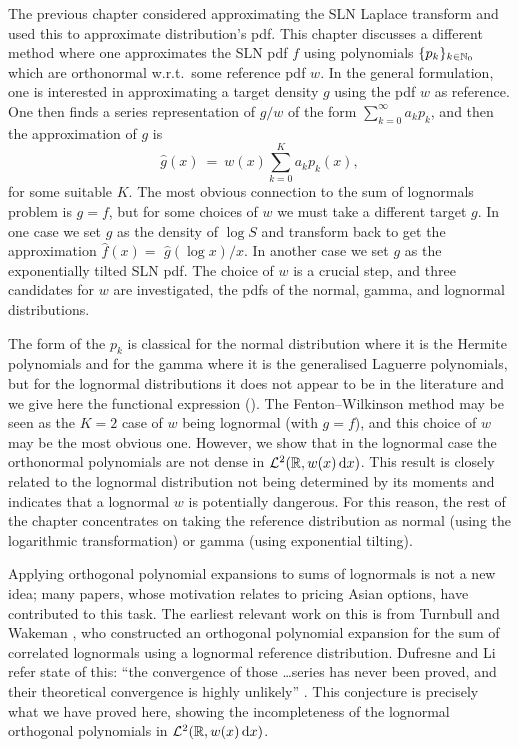 The previous chapter considered approximating the SLN Laplace transform and used this to approximate distribution's pdf. This chapter discusses a different method where one approximates the SLN pdf $f$ using polynomials $\{p_k\}_{k\in\mathbb{N}_0}$ which are orthonormal w.r.t.\ some reference pdf $w$. In the general formulation, one is interested in approximating a target density $g$ using the pdf $w$ as reference.
One then finds
a series representation of $g/w$ of the form $\sum_{k=0}^\infty a_k p_k$,
and then the approximation of $g$ is
\begin{equation} \label{orthog_approx}
	\widehat{g}(x)\ =\ w(x) \sum_{k=0}^K a_k p_k(x),
\end{equation}
for some suitable $K$.
The most obvious connection to the sum of lognormals problem is $g=f$, but for some choices of $w$ we must take a different target $g$. In one case we set $g$ as the density of $\log S$ and transform back to get the approximation $\widehat{f}(x)=$
$\widehat{g}(\log x)/x$. In another case we set $g$ as the exponentially tilted SLN pdf.
The choice of $w$ is a crucial step, and three candidates for $w$ are investigated, the pdfs of the normal, gamma, and lognormal distributions.

The form of the $p_k$ is classical for the normal distribution where it is the Hermite polynomials and for the gamma where  it is the generalised Laguerre polynomials,
but for the lognormal distributions it does not appear to be in the literature and we give here  the functional expression
(). The Fenton--Wilkinson method may be seen
as the $K=2$ case of $w$ being lognormal (with $g=f$), and this choice of $w$  may be the most obvious one.
However, we show that in the lognormal case the orthonormal polynomials are not dense in $\mathcal{L}^2(\mathbb{R}, w(x) \mathop{}\!\mathrm{d} x)$. This result is closely related
to the lognormal distribution not being determined by its moments
\cite{Heyde63,Berg1984} and indicates that a lognormal $w$ is potentially dangerous.
For this reason, the rest of the chapter concentrates on  taking the reference distribution as normal (using the logarithmic transformation)
or gamma  (using exponential tilting).

Applying orthogonal polynomial expansions to sums of lognormals is not a new idea; many papers, whose motivation relates to pricing Asian options, have contributed to this task. The earliest relevant work on this is from Turnbull and Wakeman \cite{turnbull1991quick}, who constructed an orthogonal polynomial expansion for the sum of correlated lognormals using a lognormal reference distribution. Dufresne and Li refer state of this: ``the convergence of those \dots series has never been proved, and their theoretical convergence is highly unlikely'' \cite[p.\ 1]{dufresne2016pricing}. This conjecture is precisely what we have proved here, showing the incompleteness of the lognormal orthogonal polynomials in $\mathcal{L}^2(\mathbb{R}, w(x) \mathop{}\!\mathrm{d} x)$.

